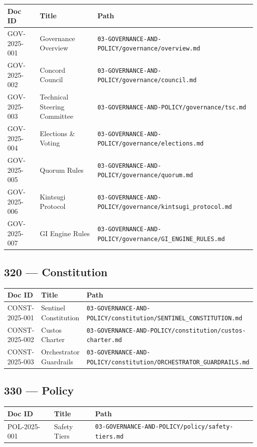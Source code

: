 \documentclass[11pt,a4paper]{article}
\begin{document}
\begin{longtable}{p{2cm}p{8cm}p{3cm}}
\toprule
\textbf{Doc ID} & \textbf{Title} & \textbf{Path} \\
\midrule
GOV-2025-001 & Governance Overview & \texttt{03-GOVERNANCE-AND-POLICY/governance/overview.md} \\
GOV-2025-002 & Concord Council & \texttt{03-GOVERNANCE-AND-POLICY/governance/council.md} \\
GOV-2025-003 & Technical Steering Committee & \texttt{03-GOVERNANCE-AND-POLICY/governance/tsc.md} \\
GOV-2025-004 & Elections \& Voting & \texttt{03-GOVERNANCE-AND-POLICY/governance/elections.md} \\
GOV-2025-005 & Quorum Rules & \texttt{03-GOVERNANCE-AND-POLICY/governance/quorum.md} \\
GOV-2025-006 & Kintsugi Protocol & \texttt{03-GOVERNANCE-AND-POLICY/governance/kintsugi\_protocol.md} \\
GOV-2025-007 & GI Engine Rules & \texttt{03-GOVERNANCE-AND-POLICY/governance/GI\_ENGINE\_RULES.md} \\
\bottomrule
\end{longtable}

\subsection{320 — Constitution}

\begin{longtable}{p{2cm}p{8cm}p{3cm}}
\toprule
\textbf{Doc ID} & \textbf{Title} & \textbf{Path} \\
\midrule
CONST-2025-001 & Sentinel Constitution & \texttt{03-GOVERNANCE-AND-POLICY/constitution/SENTINEL\_CONSTITUTION.md} \\
CONST-2025-002 & Custos Charter & \texttt{03-GOVERNANCE-AND-POLICY/constitution/custos-charter.md} \\
CONST-2025-003 & Orchestrator Guardrails & \texttt{03-GOVERNANCE-AND-POLICY/constitution/ORCHESTRATOR\_GUARDRAILS.md} \\
\bottomrule
\end{longtable}

\subsection{330 — Policy}

\begin{longtable}{p{2cm}p{8cm}p{3cm}}
\toprule
\textbf{Doc ID} & \textbf{Title} & \textbf{Path} \\
\midrule
POL-2025-001 & Safety Tiers & \texttt{03-GOVERNANCE-AND-POLICY/policy/safety-tiers.md} \\
\bottomrule
\end{longtable}
\end{document}
